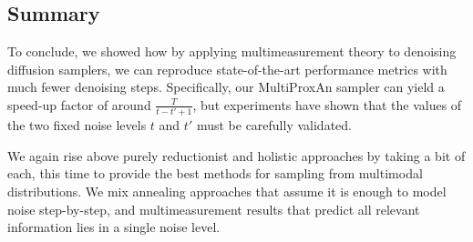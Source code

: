 \subsection{Summary}

To conclude, we showed how by applying multimeasurement theory to denoising diffusion samplers, we can reproduce state-of-the-art performance metrics with much fewer denoising steps. Specifically, our MultiProxAn sampler can yield a speed-up factor of around $\frac{T}{t-t'+1}$, but experiments have shown that the values of the two fixed noise levels $t$ and $t'$ must be carefully validated. 

We again rise above purely reductionist and holistic approaches by taking a bit of each, this time to provide the best methods for sampling from multimodal distributions. We mix annealing approaches that assume it is enough to model noise step-by-step, and multimeasurement results that predict all relevant information lies in a single noise level. 